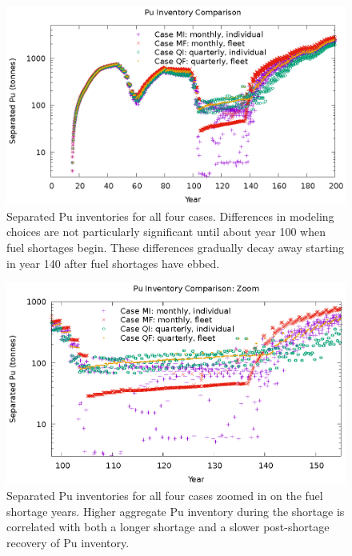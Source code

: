 \documentclass{style}
\begin{document}
\begin{figure}[!h]
    \centering
    \includegraphics[width=1.0\textwidth]{exp2/puinv-compare.eps}
    \caption{
        Separated Pu inventories for all four cases.  Differences in modeling
        choices are not particularly significant until about year 100 when
        fuel shortages begin.  These differences gradually decay away starting
        in year 140 after fuel shortages have ebbed.
    }
    \label{fig:puinv-compare}
\end{figure}

\begin{figure}[!h]
    \centering
    \includegraphics[width=1.0\textwidth]{exp2/puinv-compare-zoom.eps}
    \caption{
        Separated Pu inventories for all four cases zoomed in on the fuel
        shortage years.  Higher aggregate Pu inventory  during the shortage is
        correlated with both a longer shortage and a slower post-shortage
        recovery of Pu inventory.
    }
    \label{fig:puinv-compare-zoom}
\end{figure}
\end{document}
